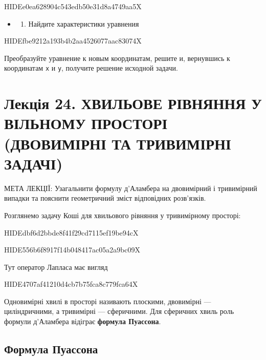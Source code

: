 \documentclass[
  ukrainian,
]{article}
\providecommand{\tightlist}{%
  \setlength{\itemsep}{0pt}\setlength{\parskip}{0pt}}
\begin{document}
HIDEe0ea628904c543edb50e31d8a4749aa5X

\begin{itemize}
\tightlist
\item
  \begin{enumerate}
  \def\labelenumi{\arabic{enumi}.}
  \setcounter{enumi}{5}
  \tightlist
  \item
    Найдите характеристики уравнения
  \end{enumerate}
\end{itemize}

HIDEfbe9212a193b4b2aa4526077aac83074X

Преобразуйте уравнение к новым координатам, решите и, вернувшись к
координатам \texttt{x} и \texttt{y}, получите решение исходной задачи.

\section{Лекція 24. ХВИЛЬОВЕ РІВНЯННЯ У ВІЛЬНОМУ ПРОСТОРІ (ДВОВИМІРНІ ТА
ТРИВИМІРНІ
ЗАДАЧІ)}\label{ux43bux435ux43aux446ux456ux44f-24.-ux445ux432ux438ux43bux44cux43eux432ux435-ux440ux456ux432ux43dux44fux43dux43dux44f-ux443-ux432ux456ux43bux44cux43dux43eux43cux443-ux43fux440ux43eux441ux442ux43eux440ux456-ux434ux432ux43eux432ux438ux43cux456ux440ux43dux456-ux442ux430-ux442ux440ux438ux432ux438ux43cux456ux440ux43dux456-ux437ux430ux434ux430ux447ux456}

МЕТА ЛЕКЦІЇ: Узагальнити формулу д'Аламбера на двовимірний і тривимірний
випадки та пояснити геометричний зміст відповідних розв'язків.

Розглянемо задачу Коші для хвильового рівняння у тривимірному просторі:

HIDEdbf6d2bbde8f41f29cd7115ef19be94cX

HIDE556b6f8917f14b048417ac05a2a9bc09X

Тут оператор Лапласа має вигляд

HIDE4707af41210d4cb7b75fca8c779fca64X

Одновимірні хвилі в просторі називають плоскими, двовимірні ---
циліндричними, а тривимірні --- сферичними. Для сферичних хвиль роль
формули д'Аламбера відіграє \textbf{формула Пуассона}.

\subsection{Формула
Пуассона}\label{ux444ux43eux440ux43cux443ux43bux430-ux43fux443ux430ux441ux441ux43eux43dux430}
\end{document}
